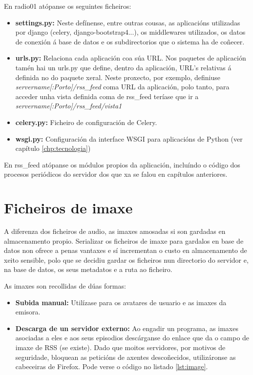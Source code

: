 En radio01 atópanse os seguintes ficheiros: 

\begin{itemize}
	\item \textbf{settings.py:} Neste defínense, entre outras cousas, as aplicacións utilizadas por django (celery, django-bootstrap4...), os middlewares utilizados, os datos de conexión á base de datos e os subdirectorios que o sistema ha de coñecer. 

	\item \textbf{urls.py:} Relaciona cada aplicación coa súa URL. Nos paquetes de aplicación tamén hai un urls.py que define, dentro da aplicación, URL's relativas á definida no do paquete xeral. Neste proxecto, por exemplo, definiuse \textit{servername[:Porto]/rss\_feed} coma URL da aplicación, polo tanto, para acceder unha vista definida coma  de rss\_feed teríase que ir a \textit{servername[:Porto]/rss\_feed/vista1} 
	
	\item \textbf{celery.py:} Ficheiro de configuración de Celery.
	
	\item \textbf{wsgi.py:} Configuración da interface WSGI para aplicacións de Python (ver capítulo \ref{chp:tecnologia})
	
\end{itemize}

En rss\_feed atópanse os módulos propios da aplicación, incluíndo o código dos procesos periódicos do servidor dos que xa se falou en capítulos anteriores.


\section{Ficheiros de imaxe}

A diferenza dos ficheiros de audio, as imaxes amosadas si son gardadas en almacenamento propio. Serializar os ficheiros de imaxe para gardalos en base de datos non ofrece a penas vantaxes e sí incrementan o custo en almacenamento de xeito sensible, polo que se decidiu gardar os ficheiros nun directorio do servidor e, na base de datos, os seus metadatos e a ruta 
 ao ficheiro.
 
As imaxes son recollidas de dúas formas:

\begin{itemize}
\item \textbf{Subida manual:} Utilízase para os avatares de usuario e as imaxes da emisora.
\item \textbf{Descarga de un servidor externo:} Ao engadir un programa, as imaxes asociadas a eles e aos seus episodios descárganse do enlace que da o campo de imaxe de RSS (se existe). Dado que moitos servidores, por motivos de seguridade, bloquean as peticións de axentes descoñecidos, utilizáronse as cabeceiras de Firefox. Pode verse o código no listado \ref{lst:image}.
\end{itemize}

